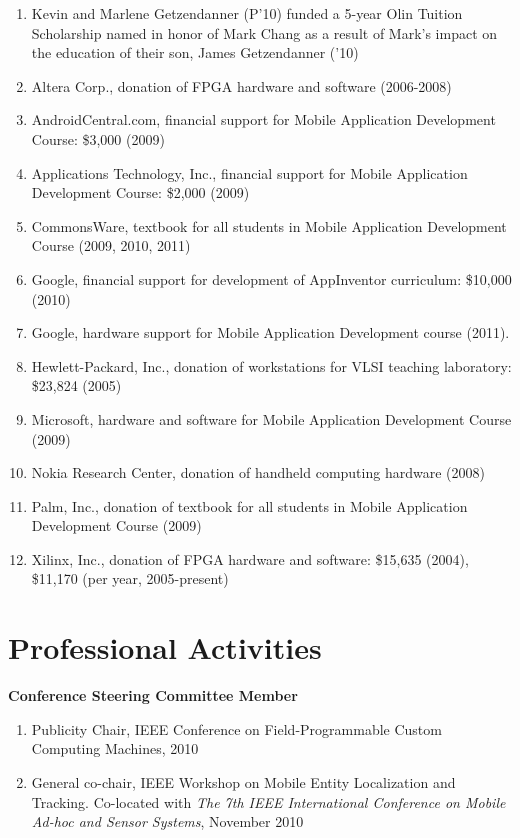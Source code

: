 \documentclass[line]{res}
\begin{document}
\begin{resume}
\begin{enumerate}
		\item Kevin and Marlene Getzendanner (P'10) funded a 5-year Olin Tuition Scholarship named in honor of Mark Chang as a result of Mark’s impact on the education of their son, James Getzendanner ('10) 
		\item Altera Corp., donation of FPGA hardware and software (2006-2008) 
		\item AndroidCentral.com, financial support for Mobile Application Development Course: \$3,000 (2009) 
		\item Applications Technology, Inc., financial support for Mobile Application Development Course: \$2,000 (2009) 
		\item CommonsWare, textbook for all students in Mobile Application Development Course (2009, 2010, 2011) 
		\item Google, financial support for development of AppInventor curriculum: \$10,000 (2010)
		\item Google, hardware support for Mobile Application Development course (2011).
		\item Hewlett-Packard, Inc., donation of workstations for VLSI teaching laboratory: \$23,824 (2005) 
		\item Microsoft, hardware and software for Mobile Application Development Course (2009) 
		\item Nokia Research Center, donation of handheld computing hardware (2008) 
		\item Palm, Inc., donation of textbook for all students in Mobile Application Development Course (2009) 
		\item Xilinx, Inc., donation of FPGA hardware and software: \$15,635 (2004), \$11,170 (per year, 2005-present)
	\end{enumerate}
	
	\section{\sc Professional Activities}
	
	\textbf{Conference Steering Committee Member}
	\begin{enumerate}
		\item Publicity Chair, IEEE Conference on Field-Programmable Custom Computing Machines, 2010 
		\item General co-chair, IEEE Workshop on Mobile Entity Localization and Tracking. Co-located with \textit{The 7th IEEE International Conference on Mobile Ad-hoc and Sensor Systems}, November 2010 
	\end{enumerate}
	

\end{resume}
\end{document}
